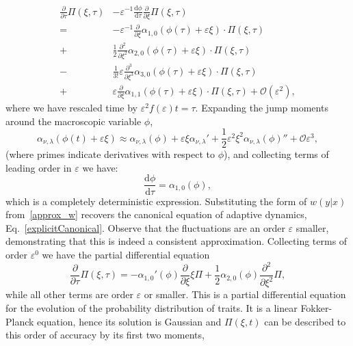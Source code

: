 \begin{align}
\frac{\partial }{\partial \tau}\Pi(\xi, \tau) & - \varepsilon^{-1} \frac{\mathrm{d} \phi}{\mathrm{d} \tau} \frac{\partial }{\partial \xi}\Pi(\xi, \tau) \nonumber \\
=& - \varepsilon^{-1} \frac{\partial}{\partial \xi} \alpha_{1,0}(\phi(\tau) + \varepsilon \xi) \cdot \Pi(\xi, \tau) \nonumber \\
+& \frac{1}{2} \frac{\partial^2}{\partial \xi^2} \alpha_{2,0}(\phi(\tau) + \varepsilon \xi) \cdot \Pi(\xi, \tau)  \nonumber \\
-& \frac{1}{3!} \varepsilon \frac{\partial^3}{\partial \xi^3} \alpha_{3,0}(\phi(\tau) + \varepsilon \xi) \cdot \Pi(\xi, \tau) \nonumber \\ 
+& \varepsilon \frac{\partial}{\partial \xi} \alpha_{1,1}(\phi(\tau) + \varepsilon \xi) \cdot \Pi(\xi, \tau)  +\mathcal{O}(\varepsilon^2), 
\end{align}
where we have rescaled time by $\varepsilon^2 f(\varepsilon)t = \tau$. Expanding the jump moments around the macroscopic variable $\phi$, 
\begin{equation*}
\alpha_{\nu, \lambda}(\phi(t)+\varepsilon \xi) \approx \alpha_{\nu, \lambda}(\phi) + \varepsilon \xi \alpha_{\nu,\lambda}' + \frac{1}{2} \varepsilon^2 \xi^2 \alpha_{\nu, \lambda}(\phi)'' + \mathcal{O} \varepsilon^3,
\end{equation*}
(where primes indicate derivatives with respect to $\phi$), and collecting terms of leading order in $\varepsilon$ we have:
\begin{equation}
\frac{\mathrm{d} \phi}{\mathrm{d} \tau} = \alpha_{1,0}(\phi), \label{canonical}
\end{equation}
which is a completely deterministic expression.  Substituting the form of $w(y|x)$ from~\eqref{approx_w} recovers the canonical equation of adaptive dynamics, Eq.~\eqref{explicitCanonical}.  Observe that the fluctuations are an order $\varepsilon$ smaller, demonstrating that this is indeed a consistent approximation.  Collecting terms of order $\varepsilon^0$ we have the partial differential equation
\begin{equation}
\frac{\partial}{\partial \tau}\Pi(\xi, \tau)= -\alpha_{1,0}'(\phi) \frac{\partial}{\partial \xi} \xi \Pi + \frac{1}{2} \alpha_{2,0}(\phi) \frac{\partial^2}{\partial \xi^2} \Pi \label{FP},
\end{equation}
while all other terms are order $\varepsilon$ or smaller.  This is a partial differential equation for the evolution of the probability distribution of traits.  It is a linear Fokker-Planck equation, hence its solution is Gaussian and $\Pi(\xi, t)$ can be described to this order of accuracy by its first two moments, 

